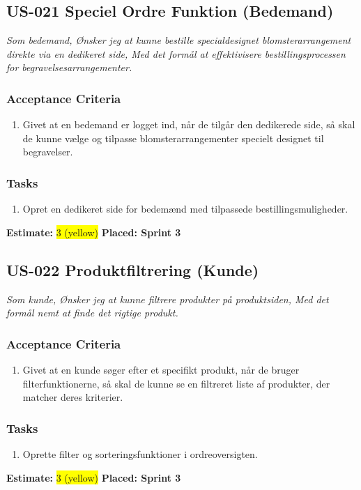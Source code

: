 \subsection{US-021 Speciel Ordre Funktion (Bedemand)}
\label{sec:US-021}
\textit{Som bedemand, Ønsker jeg at kunne bestille specialdesignet blomsterarrangement direkte via en dedikeret side, Med det formål at effektivisere bestillingsprocessen for begravelsesarrangementer.}
\subsubsection*{\textbf{Acceptance Criteria}}
\begin{enumerate}
  \item Givet at en bedemand er logget ind, når de tilgår den dedikerede side, så skal de kunne vælge og tilpasse blomsterarrangementer specielt designet til begravelser.
\end{enumerate}
\subsubsection*{\textbf{Tasks}}
\begin{enumerate}
  \item Opret en dedikeret side for bedemænd med tilpassede bestillingsmuligheder.
\end{enumerate}
\textbf{Estimate:} \colorbox{yellow}{3 (yellow)}
\textbf{Placed: Sprint 3}
\par\noindent\dotfill

\subsection{US-022 Produktfiltrering (Kunde)}
\label{sec:US-022}
\textit{Som kunde, Ønsker jeg at kunne filtrere produkter på produktsiden, Med det formål nemt at finde det rigtige produkt.}
\subsubsection*{\textbf{Acceptance Criteria}}
\begin{enumerate}
  \item Givet at en kunde søger efter et specifikt produkt, når de bruger filterfunktionerne, så skal de kunne se en filtreret liste af produkter, der matcher deres kriterier.
\end{enumerate}
\subsubsection*{\textbf{Tasks}}
\begin{enumerate}
  \item Oprette filter og sorteringsfunktioner i ordreoversigten.
\end{enumerate}
\textbf{Estimate:} \colorbox{yellow}{3 (yellow)}
\textbf{Placed: Sprint 3}
\par\noindent\dotfill

